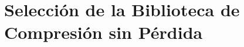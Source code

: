 \section{Selección de la Biblioteca de Compresión sin Pérdida}
\label{sec:biblioteca_compresion}






